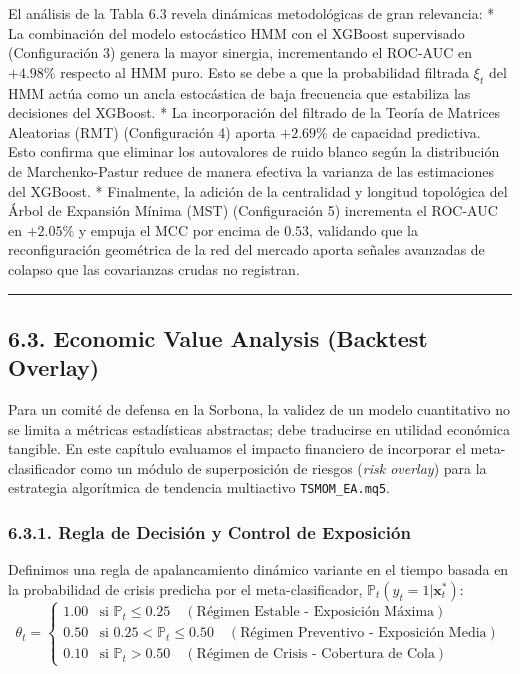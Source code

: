 \documentclass[
  12pt,
]{article}
\begin{document}
El análisis de la Tabla 6.3 revela dinámicas metodológicas de gran
relevancia: * La combinación del modelo estocástico HMM con el XGBoost
supervisado (Configuración 3) genera la mayor sinergia, incrementando el
ROC-AUC en \(+4.98\%\) respecto al HMM puro. Esto se debe a que la
probabilidad filtrada \(\xi_t\) del HMM actúa como un ancla estocástica
de baja frecuencia que estabiliza las decisiones del XGBoost. * La
incorporación del filtrado de la Teoría de Matrices Aleatorias (RMT)
(Configuración 4) aporta \(+2.69\%\) de capacidad predictiva. Esto
confirma que eliminar los autovalores de ruido blanco según la
distribución de Marchenko-Pastur reduce de manera efectiva la varianza
de las estimaciones del XGBoost. * Finalmente, la adición de la
centralidad y longitud topológica del Árbol de Expansión Mínima (MST)
(Configuración 5) incrementa el ROC-AUC en \(+2.05\%\) y empuja el MCC
por encima de \(0.53\), validando que la reconfiguración geométrica de
la red del mercado aporta señales avanzadas de colapso que las
covarianzas crudas no registran.

\begin{center}\rule{0.5\linewidth}{0.5pt}\end{center}

\subsection{6.3. Economic Value Analysis (Backtest Overlay)}\label{capuxedtulo-6b-economic-value-analysis-backtest-overlay}

Para un comité de defensa en la Sorbona, la validez de un modelo
cuantitativo no se limita a métricas estadísticas abstractas; debe
traducirse en utilidad económica tangible. En este capítulo evaluamos el
impacto financiero de incorporar el meta-clasificador como un módulo de
superposición de riesgos (\emph{risk overlay}) para la estrategia
algorítmica de tendencia multiactivo \texttt{TSMOM\_EA.mq5}.

\subsubsection{6.3.1. Regla de Decisión y Control de Exposición}\label{b.1.-regla-de-decisiuxf3n-y-control-de-exposiciuxf3n}

Definimos una regla de apalancamiento dinámico variante en el tiempo
basada en la probabilidad de crisis predicha por el meta-clasificador,
\(\mathbb{P}_t(y_t = 1 | \mathbf{x}_t^*)\): \[\theta_t = \begin{cases} 
1.00 & \text{si } \mathbb{P}_t \le 0.25 \quad (\text{Régimen Estable - Exposición Máxima}) \\
0.50 & \text{si } 0.25 < \mathbb{P}_t \le 0.50 \quad (\text{Régimen Preventivo - Exposición Media}) \\
0.10 & \text{si } \mathbb{P}_t > 0.50 \quad (\text{Régimen de Crisis - Cobertura de Cola})
\end{cases}\]
\end{document}
